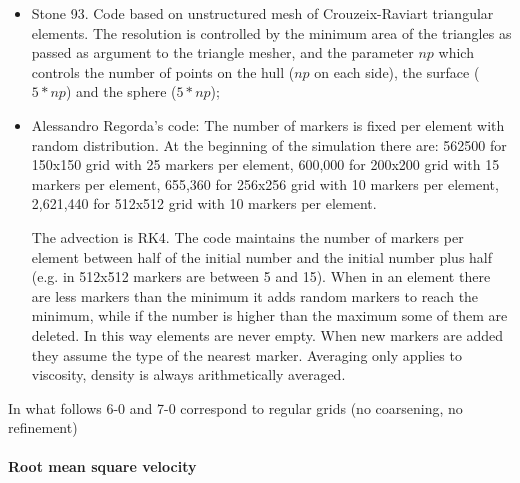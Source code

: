 \begin{itemize}
 

 
\item Stone 93. Code based on unstructured mesh of Crouzeix-Raviart triangular elements.
 The resolution is controlled by the minimum area of 
the triangles as passed as argument to the triangle mesher, and the parameter $np$ which controls
the number of points on the hull ($np$ on each side), the surface ($5*np$) and the sphere ($5*np$);

\item Alessandro Regorda's code:
The number of markers is fixed per element with random distribution.
At the beginning of the simulation there are: 562500 for 150x150 grid with 25 markers per element, 
600,000 for 200x200 grid with 15 markers per element,
655,360 for 256x256 grid with 10 markers per element,
2,621,440 for 512x512 grid with 10 markers per element.

The advection is RK4. The code maintains the number of markers per element between half of the
initial number and the initial number plus half (e.g. in 512x512
markers are between 5 and 15). When in an element there are less
markers than the minimum it adds random markers to reach the minimum,
while if the number is higher than the maximum some of them are
deleted. In this way elements are never empty. When new markers are
added they assume the type of the nearest marker.
Averaging only applies to viscosity, density is always arithmetically
averaged.




\end{itemize}

In what follows 6-0 and 7-0 correspond to regular grids (no coarsening, no refinement) 

\newpage
\paragraph{Root mean square velocity}

